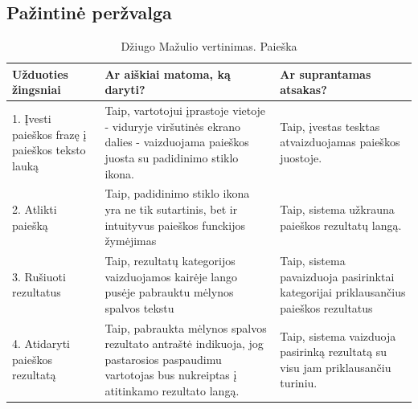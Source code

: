 \documentclass[oneside]{VUMIFPSkursinis}
\begin{document}
\subsection{Pažintinė peržvalga}

\begin{center}
\begin{longtable}[!htb]{|p{5cm}|p{5cm}|p{5cm}|}
	\caption{Džiugo Mažulio vertinimas. Paieška}
\endfirsthead
\endhead
	\hline
	Užduoties žingsniai & Ar aiškiai matoma, ką daryti? & Ar suprantamas atsakas? \\ \hline
	1. Įvesti paieškos frazę į paieškos teksto lauką & Taip, vartotojui įprastoje vietoje - viduryje viršutinės ekrano dalies - vaizduojama paieškos juosta su padidinimo stiklo ikona. & Taip, įvestas tesktas atvaizduojamas paieškos juostoje.   \\ \hline
	2. Atlikti paiešką & Taip, padidinimo stiklo ikona yra ne tik sutartinis, bet ir intuityvus paieškos funckijos žymėjimas & Taip, sistema užkrauna paieškos rezultatų langą. \\ \hline
	3. Rušiuoti rezultatus & Taip, rezultatų kategorijos vaizduojamos kairėje lango pusėje pabrauktu mėlynos spalvos tekstu & Taip, sistema pavaizduoja pasirinktai kategorijai priklausančius paieškos rezultatus \\ \hline
	4. Atidaryti paieškos rezultatą & Taip, pabraukta mėlynos spalvos rezultato antraštė indikuoja, jog pastarosios paspaudimu vartotojas bus nukreiptas į atitinkamo rezultato langą. & Taip, sistema vaizduoja pasirinką rezultatą su visu jam priklausančiu turiniu. \\ \hline
\end{longtable}
\end{center}
\end{document}
